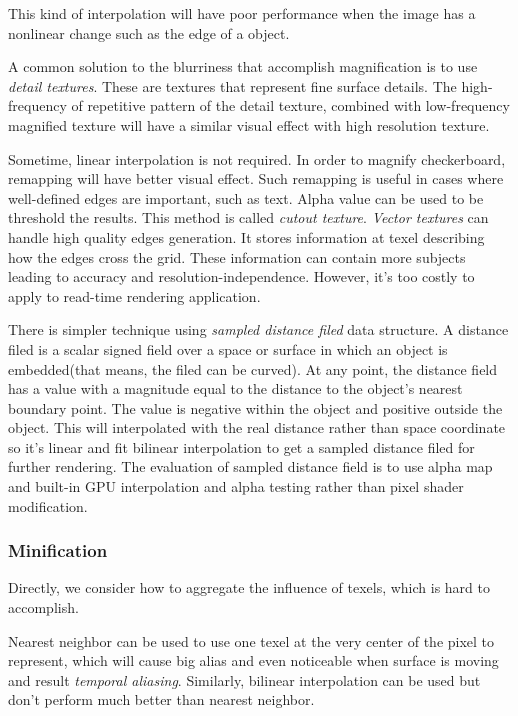 \documentclass[10pt, a4paper]{article}
\begin{document}
    This kind of interpolation will have poor performance when the image has a nonlinear change such as the edge of a object. 

    A common solution to the blurriness that accomplish magnification is to use \emph{detail textures}. These are textures that represent fine surface details. The high-frequency of repetitive pattern of the detail texture, combined with low-frequency magnified texture will have a similar visual effect with high resolution texture. 
    
    Sometime, linear interpolation is not required. In order to magnify checkerboard, remapping will have better visual effect. Such remapping is useful in cases where well-defined edges are important, such as text. Alpha value can be used to be threshold the results. This method is called \emph{cutout texture}. \emph{Vector textures} can handle high quality edges generation. It stores information at texel describing how the edges cross the grid. These information can contain more subjects leading to accuracy and resolution-independence. However, it's too costly to apply to read-time rendering application. 
    
    There is simpler technique using \emph{sampled distance filed} data structure. A distance filed is a scalar signed field over a space or surface in which an object is embedded(that means, the filed can be curved). At any point, the distance field has a value with a magnitude equal to the distance to the object's nearest boundary point. The value is negative within the object and positive outside the object. This will interpolated with the real distance rather than space coordinate so it's linear and fit bilinear interpolation to get a sampled distance filed for further rendering. The evaluation of sampled distance field is to use alpha map and built-in GPU interpolation and alpha testing rather than pixel shader modification.   
    
\subsubsection{Minification}
    Directly, we consider how to aggregate the influence of texels, which is hard to accomplish.

    Nearest neighbor can be used to use one texel at the very center of the pixel to represent, which will cause big alias and even noticeable when surface is moving and result  \emph{temporal aliasing}. Similarly, bilinear interpolation can be used but don't perform much better than nearest neighbor. 
\end{document}
